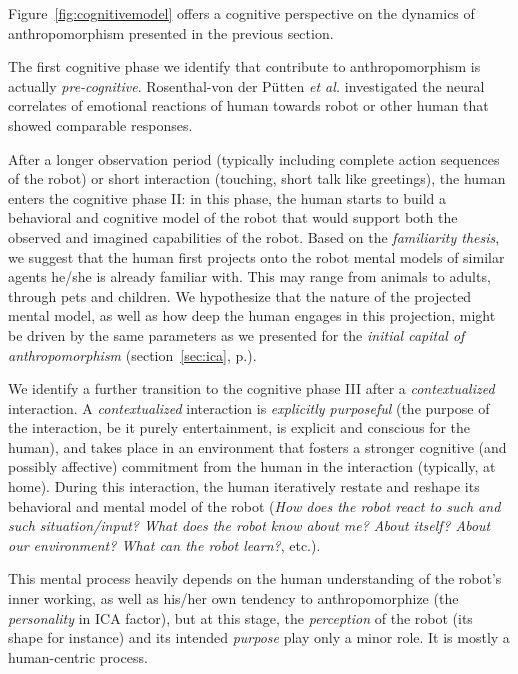\documentclass[lettersize, apacite, twoside, HRI]{apa_HRI}
\begin{document}
Figure~\ref{fig:cognitivemodel} offers a cognitive perspective on the dynamics
of anthropomorphism presented in the previous section.

The first cognitive phase we identify that contribute to anthropomorphism is
actually \emph{pre-cognitive}. Rosenthal-von der Pütten \textit{et al.} \cite{rosenthal-vonderputten_experimental_2013} investigated the neural correlates of emotional
reactions of human towards robot or other human that showed comparable
responses. 

After a longer observation period (typically including complete action
sequences of the robot) or short interaction (touching, short talk like
greetings), the human enters the cognitive phase II: in this phase, the human
starts to build a behavioral and cognitive model of the robot that would
support both the observed and imagined capabilities of the robot. Based on the
\emph{familiarity thesis}, we suggest that the human first
projects onto the robot mental models of similar agents he/she is already
familiar with. This may range from animals to adults, through pets and
children. We hypothesize that the nature of the projected mental model, as well
as how deep the human engages in this projection, might be driven by the same
parameters as we presented for the \emph{initial capital of anthropomorphism}
(section~\ref{sec:ica}, p.\pageref{sec:ica}).

We identify a further transition to the cognitive phase III after a
\emph{contextualized} interaction. A \emph{contextualized} interaction is
\emph{explicitly purposeful} (the purpose of the interaction, be it purely
entertainment, is explicit and conscious for the human), and takes place in an
environment that fosters a stronger cognitive (and possibly affective)
commitment from the human in the interaction (typically, at home). During this
interaction, the human iteratively restate and reshape its behavioral and
mental model of the robot (\emph{How does the robot react to such and such
situation/input? What does the robot know about me? About itself? About our
environment? What can the robot learn?}, etc.).

This mental process heavily depends on the human understanding of the robot's
inner working, as well as his/her own tendency to anthropomorphize (the
\emph{personality} in ICA factor), but at this stage, the \emph{perception} of
the robot (its shape for instance) and its intended \emph{purpose} play only a
minor role. It is mostly a human-centric process.
\end{document}
